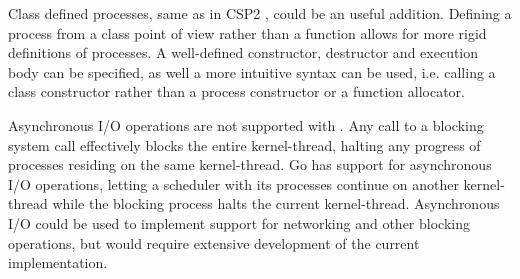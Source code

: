 Class defined processes, same as in \Cpp{}CSP2 \citep{brown2007c++csp2}, could be an useful addition. Defining a process from a class point of view rather than a function allows for more rigid definitions of processes. A well\hyp{}defined constructor, destructor and execution body can be specified, as well a more intuitive syntax can be used, i.e. calling a class constructor rather than a process constructor or a function allocator.

Asynchronous I/O operations are not supported with \Proxc{}. Any call to a blocking system call effectively blocks the entire kernel\hyp{}thread, halting any progress of processes residing on the same kernel\hyp{}thread. Go has support for asynchronous I/O operations, letting a scheduler with its processes continue on another kernel\hyp{}thread while the blocking process halts the current kernel\hyp{}thread. Asynchronous I/O could be used to implement support for networking and other blocking operations, but would require extensive development of the current implementation.

